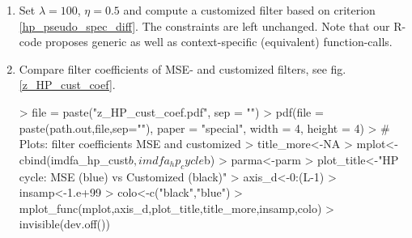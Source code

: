 \documentclass[a4paper]{book}
\begin{document}
\begin{enumerate}
\item Set $\lambda=100$, $\eta=0.5$ and compute a customized filter based on criterion \ref{hp_pseudo_spec_diff}. The constraints are left unchanged. Note that our R-code proposes generic as well as context-specific (equivalent) function-calls. 
\begin{Schunk}
\end{Schunk}
\item Compare filter coefficients of MSE- and customized filters, see fig.\ref{z_HP_cust_coef}.
\begin{Schunk}
\begin{Sinput}
> file = paste("z_HP_cust_coef.pdf", sep = "")
> pdf(file = paste(path.out,file,sep=""), paper = "special", width = 4, height = 4)
> # Plots: filter coefficients MSE and customized
> title_more<-NA
> mplot<-cbind(imdfa_hp_cust$b,imdfa_hp_cycle$b)
> parma<-parm
> plot_title<-"HP cycle: MSE (blue) vs Customized (black)"
> axis_d<-0:(L-1)
> insamp<-1.e+99
> colo<-c("black","blue")
> mplot_func(mplot,axis_d,plot_title,title_more,insamp,colo)
> invisible(dev.off())
\end{Sinput}
\end{Schunk}

\end{enumerate}
\end{document}
